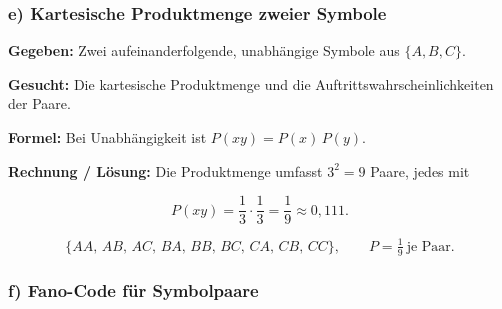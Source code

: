 \subsubsection*{e) Kartesische Produktmenge zweier Symbole}

\begin{beispiel}

\textbf{Gegeben:} Zwei aufeinanderfolgende, unabhängige Symbole aus
$\{A,B,C\}$.

\textbf{Gesucht:} Die kartesische Produktmenge und die
Auftrittswahrscheinlichkeiten der Paare.

\textbf{Formel:} Bei Unabhängigkeit ist $P(xy) = P(x)\,P(y)$.

\textbf{Rechnung / Lösung:} Die Produktmenge umfasst $3^2 = 9$ Paare, jedes mit

$$
P(xy) = \frac13\cdot\frac13 = \frac19 \approx 0{,}111.
$$

$$
\boxed{\;\{AA,\,AB,\,AC,\,BA,\,BB,\,BC,\,CA,\,CB,\,CC\},
\qquad P = \tfrac19\ \text{je Paar}.\;}
$$

\end{beispiel}

\subsubsection*{f) Fano-Code für Symbolpaare}

